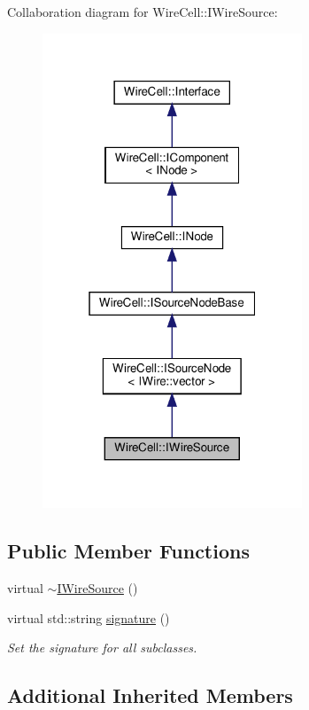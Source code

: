 Collaboration diagram for Wire\+Cell\+:\+:I\+Wire\+Source\+:
\nopagebreak
\begin{figure}[H]
\begin{center}
\leavevmode
\includegraphics[width=220pt]{class_wire_cell_1_1_i_wire_source__coll__graph}
\end{center}
\end{figure}
\subsection*{Public Member Functions}
\begin{DoxyCompactItemize}
\item 
virtual \hyperlink{class_wire_cell_1_1_i_wire_source_ae5c3b797b4566cbfd35ea45c86c7e339}{$\sim$\+I\+Wire\+Source} ()
\item 
virtual std\+::string \hyperlink{class_wire_cell_1_1_i_wire_source_ad72fdd8f8e747a7ea5707fb5b0eef594}{signature} ()
\begin{DoxyCompactList}\small\item\em Set the signature for all subclasses. \end{DoxyCompactList}\end{DoxyCompactItemize}
\subsection*{Additional Inherited Members}



